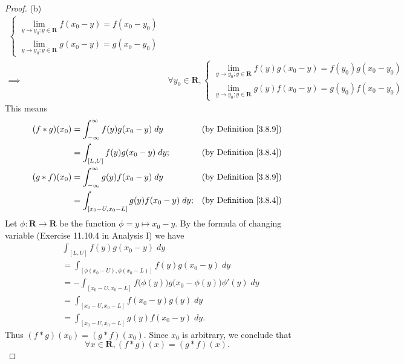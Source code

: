 \begin{proof}{(b)}
\begin{align*}
\begin{cases}
                                                   \lim_{y \to y_0 ; y \in \mathbf{R}} f(x_0 - y) = f(x_0 - y_0) \\
                                                   \lim_{y \to y_0 ; y \in \mathbf{R}} g(x_0 - y) = g(x_0 - y_0)
                                               \end{cases}             \\
        \implies & \forall y_0 \in \mathbf{R}, \begin{cases}
                                                   \lim_{y \to y_0 ; y \in \mathbf{R}} f(y) g(x_0 - y) = f(y_0) g(x_0 - y_0) \\
                                                   \lim_{y \to y_0 ; y \in \mathbf{R}} g(y) f(x_0 - y) = g(y_0) f(x_0 - y_0)
                                               \end{cases}
    \end{align*}
    This means
    \begin{align*}
        (f * g)(x_0) & = \int_{-\infty}^\infty f(y) g(x_0 - y) \; dy      & \text{(by Definition \ref{3.8.9})} \\
                     & = \int_{[L, U]} f(y) g(x_0 - y) \; dy;             & \text{(by Definition \ref{3.8.4})} \\
        (g * f)(x_0) & = \int_{-\infty}^\infty g(y) f(x_0 - y) \; dy      & \text{(by Definition \ref{3.8.9})} \\
                     & = \int_{[x_0 - U, x_0 - L]} g(y) f(x_0 - y) \; dy; & \text{(by Definition \ref{3.8.4})}
    \end{align*}
    Let \(\phi : \mathbf{R} \to \mathbf{R}\) be the function \(\phi = y \mapsto x_0 - y\).
    By the formula of changing variable (Exercise 11.10.4 in Analysis I) we have
    \begin{align*}
         & \int_{[L, U]} f(y) g(x_0 - y) \; dy                                                     \\
         & = \int_{[\phi(x_0 - U), \phi(x_0 - L)]} f(y) g(x_0 - y) \; dy                           \\
         & = -\int_{[x_0 - U, x_0 - L]} f\big(\phi(y)\big) g\big(x_0 - \phi(y)\big) \phi'(y) \; dy \\
         & = \int_{[x_0 - U, x_0 - L]} f(x_0 - y) g(y) \; dy                                       \\
         & = \int_{[x_0 - U, x_0 - L]} g(y) f(x_0 - y) \; dy.
    \end{align*}
    Thus \((f * g)(x_0) = (g * f)(x_0)\).
    Since \(x_0\) is arbitrary, we conclude that
    \[
        \forall x \in \mathbf{R}, (f * g)(x) = (g * f)(x).
    \]
\end{proof}

